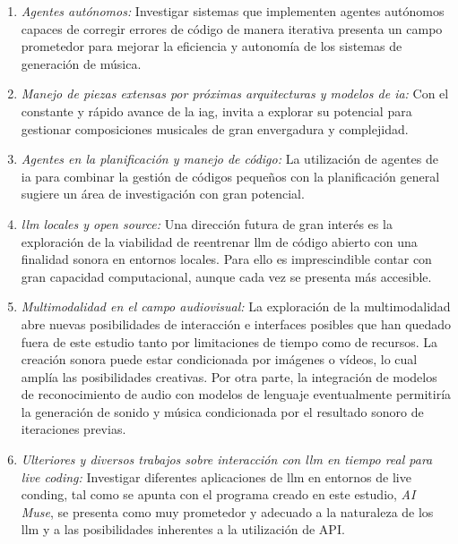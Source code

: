\begin{enumerate}
\item \textit{Agentes autónomos:} Investigar sistemas que implementen agentes autónomos capaces de corregir errores de código de manera iterativa presenta un campo prometedor para mejorar la eficiencia y autonomía de los sistemas de generación de música.

\item \textit{Manejo de piezas extensas por próximas arquitecturas y modelos de \gls{ia}:} Con el constante y rápido avance de la \gls{iag},  invita a explorar su potencial para gestionar composiciones musicales de gran envergadura y complejidad.

\item \textit{Agentes en la planificación y manejo de código:} La utilización de agentes de \gls{ia} para combinar la gestión de códigos pequeños con la planificación general sugiere un área de investigación con gran potencial.

\item \textit{\gls{llm} locales y open source:} Una dirección futura de gran interés es la exploración de la viabilidad de reentrenar \gls{llm} de código abierto con una finalidad sonora en entornos locales. Para ello es imprescindible contar con gran capacidad computacional, aunque cada vez se presenta más accesible.

\item \textit{Multimodalidad en el campo audiovisual:} La exploración de la multimodalidad abre nuevas posibilidades de interacción e interfaces posibles que han quedado fuera de este estudio tanto por limitaciones de tiempo como de recursos. La creación sonora puede estar condicionada por imágenes o vídeos, lo cual amplía las posibilidades creativas. Por otra parte, la integración de modelos de reconocimiento de audio con modelos de lenguaje eventualmente permitiría la generación de sonido y música condicionada por el resultado sonoro de iteraciones previas.

\item \textit{Ulteriores y diversos trabajos sobre interacción con \gls{llm} en tiempo real para \emph{live coding}:} Investigar diferentes aplicaciones de \gls{llm} en entornos de live conding, tal como se apunta con el programa creado en este estudio, \emph{AI Muse}, se presenta como muy prometedor y adecuado a la naturaleza de los \gls{llm} y a las posibilidades inherentes a la utilización de API.

\end{enumerate}
